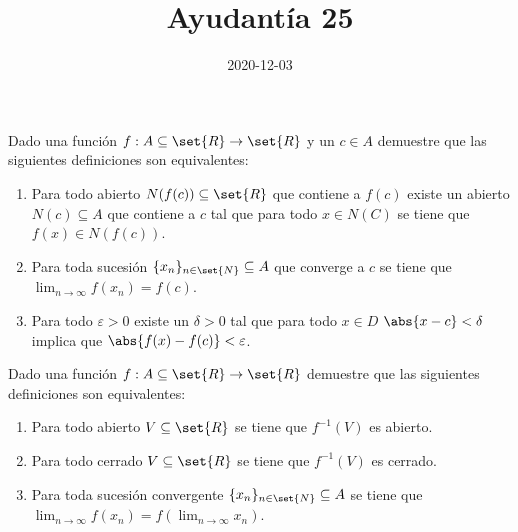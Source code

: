 \documentclass{ayudantia}
\title{Ayudantía 25}
\date{2020-12-03}
\begin{document}
\maketitle

\begin{prob}
    Dado una función \(f:A\subseteq\set{R}\rightarrow \set{R}\) y un \(c\in A\) demuestre que las siguientes definiciones son equivalentes:
    \begin{enumerate}
        \item Para todo abierto \(N(f(c))\subseteq \set{R}\) que contiene a \(f(c)\) existe un abierto \(N(c)\subseteq A\) que contiene a \(c\) tal que para todo \(x\in N(C)\) se tiene que \(f(x)\in N(f(c))\).
        \item Para toda sucesión \(\{x_n\}_{n\in\set{N}}\subseteq A\) que converge a \(c\) se tiene que \(\lim_{n\rightarrow\infty}f(x_n)=f(c)\).
        \item Para todo \(\varepsilon>0\) existe un \(\delta>0\) tal que para todo \(x\in D\) \(\abs{x-c}<\delta\) implica que \(\abs{f(x)-f(c)}<\varepsilon\).
    \end{enumerate} 
\end{prob}

\begin{ans}
    \begin{sol}

    \end{sol}
\end{ans}



\begin{prob}
    Dado una función \(f:A\subseteq\set{R}\rightarrow \set{R}\) demuestre que las siguientes definiciones son equivalentes:
    \begin{enumerate}
        \item Para todo abierto \(V\subseteq\set{R}\) se tiene que \(f^{-1}(V)\) es abierto.
        \item Para todo cerrado \(V\subseteq\set{R}\) se tiene que \(f^{-1}(V)\) es cerrado.
        \item Para toda sucesión convergente \(\{x_n\}_{n\in\set{N}}\subseteq A\) se tiene que \(\lim_{n\rightarrow\infty}f(x_n)=f(\lim_{n\rightarrow\infty}x_n)\).
    \end{enumerate}
\end{prob}

\begin{ans}
    \begin{sol}

    \end{sol}
\end{ans}
\end{document}
